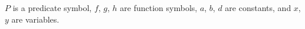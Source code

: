 $P$ is a predicate symbol, $f$, $g$, $h$ are function symbols, $a$, $b$, $d$ are constants, and $x$, $y$ are variables.
